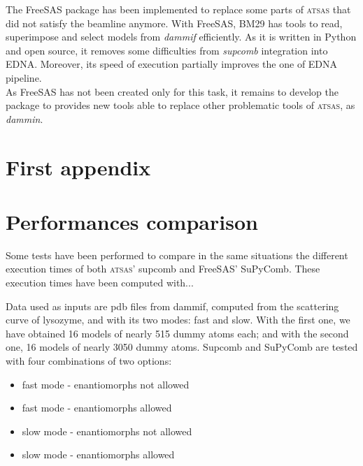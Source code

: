 \documentclass[a4paper, 11pt]{report}
\begin{document}
The FreeSAS package has been implemented to replace some parts of 
\textsc{atsas} that did not satisfy the beamline anymore. 
With FreeSAS, BM29 has tools to read, superimpose and select models 
from \textit{dammif} efficiently. 
As it is written in Python and open source, it removes some 
difficulties from \textit{supcomb} integration into EDNA. 
Moreover, its speed of execution partially improves the one of EDNA 
pipeline.\\

As FreeSAS has not been created only for this task, it remains to 
develop the package to provides new tools able to replace other 
problematic tools of \textsc{atsas}, as \textit{dammin}.


\newpage                 %



\appendix


\chapter{First appendix}

\chapter{Performances comparison}
\label{perfappendix}

Some tests have been performed to compare in the same situations the 
different execution times of both \textsc{atsas}' supcomb and FreeSAS' 
SuPyComb. 
These execution times have been computed with... %

Data used as inputs are pdb files from dammif, computed from the 
scattering curve of lysozyme, and with its two modes: fast and slow. 
With the first one, we have obtained 16 models of nearly 515 dummy 
atoms each; and with the second one, 16 models of nearly 3050 dummy 
atoms. 
Supcomb and SuPyComb are tested with four combinations of two options: 
\begin{itemize}
\item fast mode - enantiomorphs not allowed
\item fast mode - enantiomorphs allowed
\item slow mode - enantiomorphs not allowed
\item slow mode - enantiomorphs allowed
\end{itemize}
\end{document}
